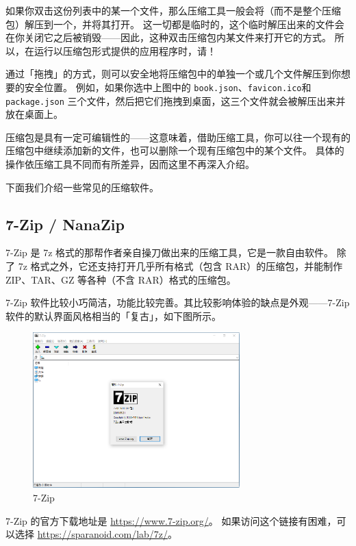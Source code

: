 如果你双击这份列表中的某一个文件，那么压缩工具一般会将（而不是整个压缩包）解压到一个，并将其打开。
这一切都是临时的，这个临时解压出来的文件会在你关闭它之后被销毁——因此，这种双击压缩包内某文件来打开它的方式。
所以，在运行以压缩包形式提供的应用程序时，请！

通过「拖拽」的方式，则可以安全地将压缩包中的单独一个或几个文件解压到你想要的安全位置。
例如，如果你选中上图中的 \verb|book.json|、\verb|favicon.ico|和 \verb|package.json| 三个文件，然后把它们拖拽到桌面，这三个文件就会被解压出来并放在桌面上。

\begin{note}
  压缩包是具有一定可编辑性的——这意味着，借助压缩工具，你可以往一个现有的压缩包中继续添加新的文件，也可以删除一个现有压缩包中的某个文件。
  具体的操作依压缩工具不同而有所差异，因而这里不再深入介绍。
\end{note}

下面我们介绍一些常见的压缩软件。

\subsection{7-Zip / NanaZip}

7-Zip 是 7z 格式的那帮作者亲自操刀做出来的压缩工具，它是一款自由软件。
除了 7z 格式之外，它还支持打开几乎所有格式（包含 RAR）的压缩包，并能制作 ZIP、TAR、GZ 等各种（不含 RAR）格式的压缩包。

7-Zip 软件比较小巧简洁，功能比较完善。其比较影响体验的缺点是外观——7-Zip 软件的默认界面风格相当的「复古」，如下图所示。

\begin{figure}[htb!]
  \centering
  \includegraphics[width=8cm]{assets/7-Zip.png}
  \caption{7-Zip}
  \label{7-Zip}
\end{figure}

7-Zip 的官方下载地址是 \url{https://www.7-zip.org/}。
如果访问这个链接有困难，可以选择 \url{https://sparanoid.com/lab/7z/}。

